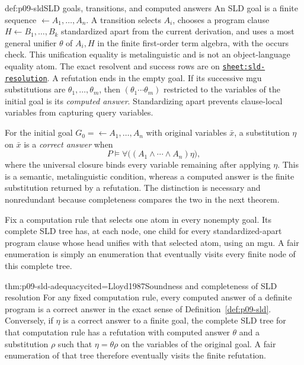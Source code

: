 \begin{hbdefinition}{def:p09-sld}{SLD goals, transitions, and computed answers}
An SLD goal is a finite sequence
\(\leftarrow A_1,\ldots,A_n\).  A transition selects \(A_i\), chooses a program
clause \(H\leftarrow B_1,\ldots,B_k\) standardized apart from the current
derivation, and uses a most general unifier \(\theta\) of \(A_i,H\) in the
finite first-order term algebra, with the occurs check.  This unification
equality is metalinguistic and is not an object-language equality atom.  The exact
resolvent and success rows are on
\hyperref[sheet:sld-resolution]{\texttt{sheet:sld-resolution}}.  A refutation
ends in the empty goal.  If its successive mgu substitutions are
\(\theta_1,\ldots,\theta_m\), then
\((\theta_1\cdots\theta_m)\) restricted to the variables of the initial goal is
its \emph{computed answer}.  Standardizing apart prevents clause-local
variables from capturing query variables.

For the initial goal \(G_0=\leftarrow A_1,\ldots,A_n\) with original variables
\(\bar x\), a substitution \(\eta\) on \(\bar x\) is a \emph{correct answer}
when
\[
 P\models\forall\bigl((A_1\land\cdots\land A_n)\eta\bigr),
\]
where the universal closure binds every variable remaining after applying
\(\eta\).  This is a semantic, metalinguistic condition, whereas a computed
answer is the finite substitution returned by a refutation.  The distinction
is necessary and nonredundant because completeness compares the two in the
next theorem.

Fix a computation rule that selects one atom in every nonempty goal.  Its
complete SLD tree has, at each node, one child for every standardized-apart
program clause whose head unifies with that selected atom, using an mgu.  A
fair enumeration is simply an enumeration that eventually visits every finite
node of this complete tree.
\end{hbdefinition}

\begin{hbtheorem}{thm:p09-sld-adequacy}{cited=Lloyd1987}{Soundness and completeness of SLD resolution}
For any fixed computation rule, every computed answer of a definite program is
a correct answer in the exact sense of Definition~\ref{def:p09-sld}.
Conversely, if \(\eta\) is a correct answer to a finite goal, the complete SLD
tree for that computation rule has a refutation with computed answer
\(\theta\) and a substitution \(\rho\) such that \(\eta=\theta\rho\) on the
variables of the original goal.  A fair enumeration of that tree therefore
eventually visits the finite refutation.
\end{hbtheorem}

